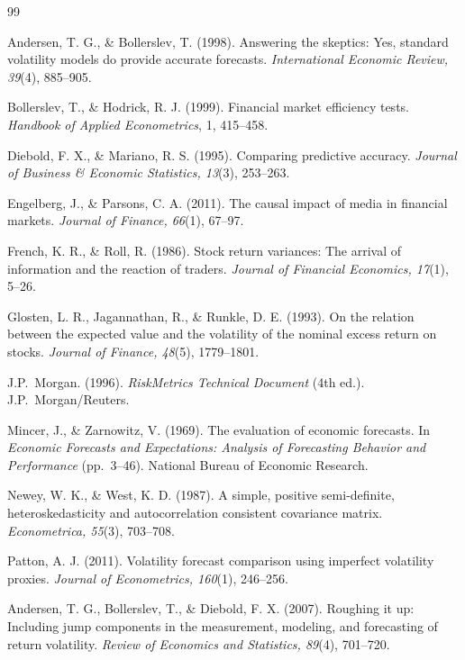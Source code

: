 \documentclass[review]{elsarticle}
\begin{document}
\newpage
\begin{thebibliography}{99}

Andersen, T. G., \& Bollerslev, T. (1998). Answering the skeptics: Yes, standard volatility models do provide accurate forecasts. \emph{International Economic Review, 39}(4), 885--905.

Bollerslev, T., \& Hodrick, R. J. (1999). Financial market efficiency tests. \emph{Handbook of Applied Econometrics}, 1, 415--458.

Diebold, F. X., \& Mariano, R. S. (1995). Comparing predictive accuracy. \emph{Journal of Business \& Economic Statistics, 13}(3), 253--263.

Engelberg, J., \& Parsons, C. A. (2011). The causal impact of media in financial markets. \emph{Journal of Finance, 66}(1), 67--97.

French, K. R., \& Roll, R. (1986). Stock return variances: The arrival of information and the reaction of traders. \emph{Journal of Financial Economics, 17}(1), 5--26.

Glosten, L. R., Jagannathan, R., \& Runkle, D. E. (1993). On the relation between the expected value and the volatility of the nominal excess return on stocks. \emph{Journal of Finance, 48}(5), 1779--1801.

J.P.\ Morgan. (1996). \emph{RiskMetrics Technical Document} (4th ed.). J.P.\ Morgan/Reuters.

Mincer, J., \& Zarnowitz, V. (1969). The evaluation of economic forecasts. In \emph{Economic Forecasts and Expectations: Analysis of Forecasting Behavior and Performance} (pp.\ 3--46). National Bureau of Economic Research.

Newey, W. K., \& West, K. D. (1987). A simple, positive semi-definite, heteroskedasticity and autocorrelation consistent covariance matrix. \emph{Econometrica, 55}(3), 703--708.

Patton, A. J. (2011). Volatility forecast comparison using imperfect volatility proxies. \emph{Journal of Econometrics, 160}(1), 246--256.

Andersen, T. G., Bollerslev, T., \& Diebold, F. X. (2007). Roughing it up: Including jump components in the measurement, modeling, and forecasting of return volatility. \emph{Review of Economics and Statistics, 89}(4), 701--720.


\end{thebibliography}
\end{document}
